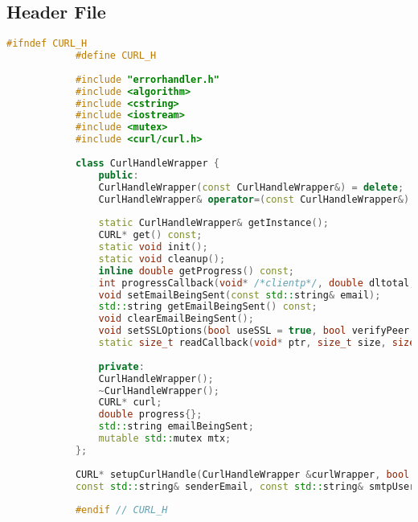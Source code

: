 \documentclass{article}
\begin{document}
	\subsection*{Header File}
	\begin{mdframed}[backgroundcolor=background, hidealllines=false, innerleftmargin=15pt, innerrightmargin=5pt, innertopmargin=0pt, innerbottommargin=-5pt]
		\begin{lstlisting}[language=C++]
			#ifndef CURL_H
			#define CURL_H
			
			#include "errorhandler.h"
			#include <algorithm>
			#include <cstring>
			#include <iostream>
			#include <mutex>
			#include <curl/curl.h>
			
			class CurlHandleWrapper {
				public:
				CurlHandleWrapper(const CurlHandleWrapper&) = delete;
				CurlHandleWrapper& operator=(const CurlHandleWrapper&) = delete;
				
				static CurlHandleWrapper& getInstance();
				CURL* get() const;
				static void init();
				static void cleanup();
				inline double getProgress() const;
				int progressCallback(void* /*clientp*/, double dltotal, double dlnow, double /*ultotal*/, double /*ulnow*/);
				void setEmailBeingSent(const std::string& email);
				std::string getEmailBeingSent() const;
				void clearEmailBeingSent();
				void setSSLOptions(bool useSSL = true, bool verifyPeer = true, bool verifyHost = true);
				static size_t readCallback(void* ptr, size_t size, size_t nmemb, void* userp);
				
				private:
				CurlHandleWrapper();
				~CurlHandleWrapper();
				CURL* curl;
				double progress{};
				std::string emailBeingSent;
				mutable std::mutex mtx;
			};
			
			CURL* setupCurlHandle(CurlHandleWrapper &curlWrapper, bool useSSL, bool verifyPeer, bool verifyHost, bool verbose,
			const std::string& senderEmail, const std::string& smtpUsername, std::string& mailPassDecrypted, int smtpPort, const std::string& smtpServer);
			
			#endif // CURL_H
		\end{lstlisting}
	\end{mdframed}
	
\end{document}
